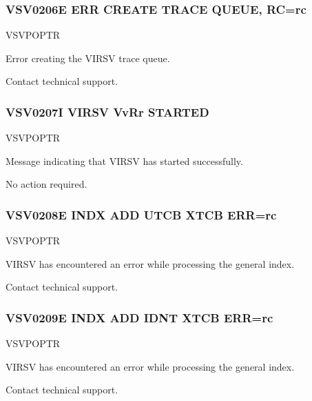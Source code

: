\documentclass[letterpaper,10pt,english]{sphinxmanual}
\begin{document}
\subsubsection{VSV0206E ERR CREATE TRACE QUEUE, RC=rc}
\label{\detokenize{messages:vsv0206e-err-create-trace-queue-rc-rc}}\begin{description}
\sphinxAtStartPar
VSVPOPTR

\sphinxAtStartPar
Error creating the VIRSV trace queue.

\sphinxAtStartPar
Contact technical support.

\end{description}


\subsubsection{VSV0207I VIRSV VvRr STARTED}
\label{\detokenize{messages:vsv0207i-virsv-vvrr-started}}\begin{description}
\sphinxAtStartPar
VSVPOPTR

\sphinxAtStartPar
Message indicating that VIRSV has started successfully.

\sphinxAtStartPar
No action required.

\end{description}


\subsubsection{VSV0208E INDX ADD UTCB XTCB ERR=rc}
\label{\detokenize{messages:vsv0208e-indx-add-utcb-xtcb-err-rc}}\begin{description}
\sphinxAtStartPar
VSVPOPTR

\sphinxAtStartPar
VIRSV has encountered an error while processing the general index.

\sphinxAtStartPar
Contact technical support.

\end{description}


\subsubsection{VSV0209E INDX ADD IDNT XTCB ERR=rc}
\label{\detokenize{messages:vsv0209e-indx-add-idnt-xtcb-err-rc}}\begin{description}
\sphinxAtStartPar
VSVPOPTR

\sphinxAtStartPar
VIRSV has encountered an error while processing the general index.

\sphinxAtStartPar
Contact technical support.

\end{description}
\end{document}
